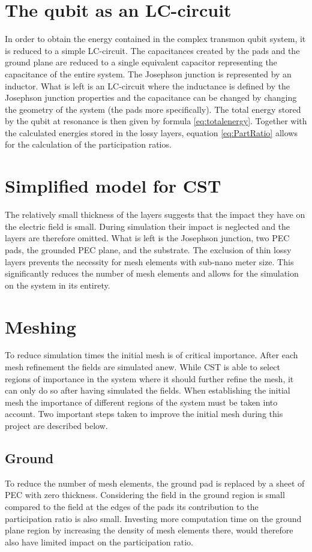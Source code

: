 \section{The qubit as an LC-circuit}
In order to obtain the energy contained in the complex transmon qubit system, it is reduced to a simple LC-circuit. The capacitances created by the pads and the ground plane are reduced to a single equivalent capacitor representing the capacitance of the entire system. The Josephson junction is represented by an inductor. What is left is an LC-circuit where the inductance is defined by the Josephson junction properties and the capacitance can be changed by changing the geometry of the system (the pads more specifically). The total energy stored by the qubit at resonance is then given by formula \eqref{eq:totalenergy}. Together with the calculated energies stored in the lossy layers, equation \eqref{eq:PartRatio} allows for the calculation of the participation ratios.

\section{Simplified model for CST}
The relatively small thickness of the layers suggests that the impact they have on the electric field is small. During simulation their impact is neglected and the layers are therefore omitted. What is left is the Josephson junction, two PEC pads, the grounded PEC plane, and the substrate. The exclusion of thin lossy layers prevents the necessity for mesh elements with sub-nano meter size. This significantly reduces the number of mesh elements and allows for the simulation on the system in its entirety.

\section{Meshing}
To reduce simulation times the initial mesh is of critical importance. After each mesh refinement the fields are simulated anew. While CST is able to select regions of importance in the system where it should further refine the mesh, it can only do so after having simulated the fields. When establishing the initial mesh the importance of different regions of the system must be taken into account. Two  important steps taken to improve the initial mesh during this project are described below.   


\subsection{Ground}
To reduce the number of mesh elements, the ground pad is replaced by a sheet of PEC with zero thickness. Considering the field in the ground region is small compared to the field at the edges of the pads its contribution to the participation ratio is also small. Investing more computation time on the ground plane region by increasing the density of mesh elements there, would therefore also have limited impact on the participation ratio.
